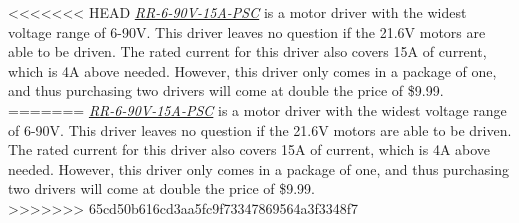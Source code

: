 <<<<<<< HEAD
\noindent \underline{\textit{RR-6-90V-15A-PSC}} is a motor driver with the widest voltage range of 6-90V. This driver leaves no question if the 21.6V motors are able to be driven. The rated current for this driver also covers 15A of current, which is 4A above needed. However, this driver only comes in a package of one, and thus purchasing two drivers will come at double the price of \$9.99.\\
=======
 \noindent \underline{\textit{RR-6-90V-15A-PSC}} is a motor driver with the widest voltage range of 6-90V. This driver leaves no question if the 21.6V motors are able to be driven. The rated current for this driver also covers 15A of current, which is 4A above needed. However, this driver only comes in a package of one, and thus purchasing two drivers will come at double the price of \$9.99.\\
 
>>>>>>> 65cd50b616cd3aa5fc9f73347869564a3f3348f7
